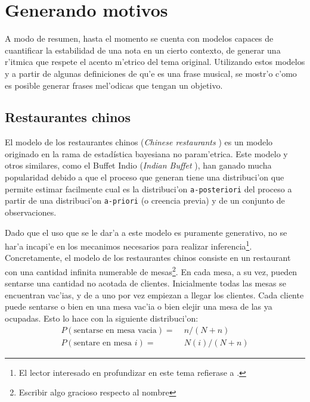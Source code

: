 \section{Generando motivos}
A modo de resumen, hasta el momento se cuenta con modelos capaces de cuantificar la estabilidad de una nota en un cierto contexto, de generar una r'itmica que
respete el acento m'etrico del tema original. Utilizando estos modelos y a partir de algunas definiciones de qu'e es una frase musical, se mostr'o c'omo es posible
generar frases mel'odicas que tengan un objetivo. 


\subsection{Restaurantes chinos}
El modelo de los restaurantes chinos (\emph{Chinese restaurants} \cita) es un modelo originado en la rama de estad\'istica bayesiana no param'etrica.
Este modelo y otros similares, como el Buffet Indio (\emph{Indian Buffet} \cita), han ganado mucha popularidad debido a que el proceso que generan
tiene una distribuci'on que permite estimar facilmente cual es la distribuci'on \texttt{a-posteriori} del proceso a partir de una distribuci'on 
\texttt{a-priori} (o creencia previa) y de un conjunto de observaciones.

Dado que el uso que se le dar'a a este modelo es puramente generativo, no se har'a incapi'e en los mecanimos necesarios para realizar inferencia\footnote{El lector interesado en profundizar en este tema refierase a \cita.}.
Concretamente, el modelo de los restaurantes chinos consiste en un restaurant con una cantidad infinita numerable de mesas\footnote{Escribir algo gracioso respecto al nombre}. 
En cada mesa, a su vez, pueden sentarse una cantidad no acotada de clientes. Inicialmente todas las mesas se encuentran vac'ias, 
y de a uno por vez empiezan a llegar los clientes. Cada cliente puede sentarse o bien en una mesa vac'ia o bien elejir una mesa de las ya ocupadas. 
Esto lo hace con la siguiente distribuci'on:
\begin{align}
P(\text{sentarse en mesa vacia}) =&\; n/(N + n)\\
P(\text{sentare en mesa } i) =&\; N(i)/(N + n)
\end{align}

